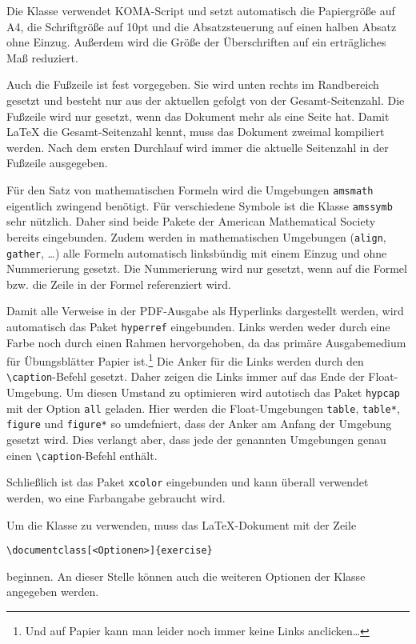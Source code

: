 \documentclass{exercise}
\begin{document}
    Die Klasse verwendet KOMA-Script \cite{koma} und setzt automatisch die
    Papiergröße auf A4, die Schriftgröße auf 10pt und die Absatzsteuerung auf
    einen halben Absatz ohne Einzug. Außerdem wird die Größe der Überschriften
    auf ein erträgliches Maß reduziert.

    Auch die Fußzeile ist fest vorgegeben. Sie wird unten rechts im Randbereich
    gesetzt und besteht nur aus der aktuellen gefolgt von der Gesamt-Seitenzahl.
    Die Fußzeile wird nur gesetzt, wenn das Dokument mehr als eine Seite hat.
    Damit \LaTeX{} die Gesamt-Seitenzahl kennt, muss das Dokument zweimal
    kompiliert werden. Nach dem ersten Durchlauf wird immer die aktuelle Seitenzahl
    in der Fußzeile ausgegeben.

    Für den Satz von mathematischen Formeln wird die Umgebungen \texttt{amsmath}
    \cite{amsmath} eigentlich zwingend benötigt. Für verschiedene Symbole ist
    die Klasse \texttt{amssymb} sehr nützlich. Daher sind beide Pakete der
    American Mathematical Society bereits eingebunden. Zudem werden in
    mathematischen Umgebungen (\texttt{align}, \texttt{gather}, \ldots) alle
    Formeln automatisch linksbündig mit einem Einzug und ohne Nummerierung
    gesetzt. Die Nummerierung wird nur gesetzt, wenn auf die Formel bzw. die
    Zeile in der Formel referenziert wird.

    Damit alle Verweise in der PDF-Ausgabe als Hyperlinks dargestellt werden,
    wird automatisch das Paket \texttt{hyperref} \cite{hyperref} eingebunden.
    Links werden weder durch eine Farbe noch durch einen Rahmen hervorgehoben,
    da das primäre Ausgabemedium für Übungsblätter Papier ist.\footnote{Und
    auf Papier kann man leider noch immer keine Links anclicken\ldots} Die
    Anker für die Links werden durch den \lstinline{\caption}-Befehl gesetzt. Daher
    zeigen die Links immer auf das Ende der Float-Umgebung. Um diesen Umstand
    zu optimieren wird autotisch das Paket \texttt{hypcap} \cite{hypcap} mit der
    Option \texttt{all} geladen. Hier werden die Float-Umgebungen \lstinline{table},
    \lstinline{table*}, \lstinline{figure} und \lstinline{figure*} so umdefniert, dass
    der Anker am Anfang der Umgebung gesetzt wird. Dies verlangt aber, dass jede
    der genannten Umgebungen genau einen \lstinline{\caption}-Befehl enthält.

    Schließlich ist das Paket \texttt{xcolor} \cite{xcolor} eingebunden und kann
    überall verwendet werden, wo eine Farbangabe gebraucht wird.

    Um die Klasse zu verwenden, muss das \LaTeX{}-Dokument mit der Zeile
    \begin{lstlisting}[gobble=6]
      \documentclass[<Optionen>]{exercise}
    \end{lstlisting}
    beginnen. An dieser Stelle können auch die weiteren Optionen der Klasse
    angegeben werden.
\end{document}

